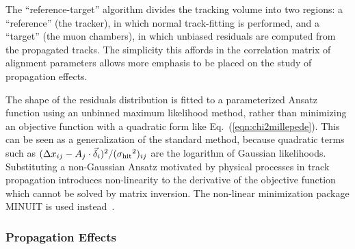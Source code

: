 \documentclass[11pt,twoside,a4paper,cmspaper]{cms-tdr}
\begin{document}
The ``reference-target'' algorithm divides the tracking volume into two
regions: a ``reference'' (the tracker), in which normal track-fitting is
performed, and a ``target'' (the muon chambers), in which unbiased
residuals are computed from the propagated tracks.  The simplicity
this affords in the correlation matrix of alignment parameters allows
more emphasis to be placed on the study of propagation effects.

The shape of the residuals distribution is fitted to a parameterized
Ansatz function using an unbinned maximum likelihood method, rather than
minimizing an objective function with a quadratic form like
Eq.~(\ref{eqn:chi2millepede}).  This can be seen as a
generalization of the standard method, because quadratic terms such as
$(\Delta x_{ij} -
A_j \cdot \vec{\delta}_i)^2/({\sigma_{\mbox{\scriptsize hit}}}^2)_{ij}$
are the logarithm of Gaussian likelihoods.  Substituting a
non-Gaussian Ansatz motivated by physical processes in track
propagation introduces non-linearity to the derivative of the
objective function which cannot be solved by matrix inversion.  
The non-linear minimization package MINUIT is used instead~\cite{James:1975dr}.

\subsubsection{Propagation Effects}
\end{document}
